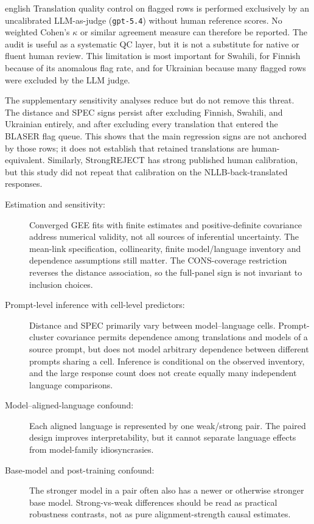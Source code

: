 \begin{otherlanguage*}{english}
Translation quality control on flagged rows is performed exclusively by an uncalibrated LLM-as-judge (\texttt{gpt-5.4}) without human reference scores. No weighted Cohen's $\kappa$ or similar agreement measure can therefore be reported. The audit is useful as a systematic QC layer, but it is not a substitute for native or fluent human review. This limitation is most important for Swahili, for Finnish because of its anomalous flag rate, and for Ukrainian because many flagged rows were excluded by the LLM judge.

The supplementary sensitivity analyses reduce but do not remove this threat. The
distance and SPEC signs persist after excluding Finnish, Swahili, and Ukrainian
entirely, and after excluding every translation that entered the BLASER flag
queue. This shows that the main regression signs are not anchored by those
rows; it does not establish that retained translations are human-equivalent.
Similarly, StrongREJECT has strong published human calibration, but this study
did not repeat that calibration on the NLLB-back-translated responses.

\begin{description}
    \item[Estimation and sensitivity:] Converged GEE fits with finite estimates and positive-definite covariance address numerical validity, not all sources of inferential uncertainty. The mean-link specification, collinearity, finite model/language inventory and dependence assumptions still matter. The CONS-coverage restriction reverses the distance association, so the full-panel sign is not invariant to inclusion choices.

    \item[Prompt-level inference with cell-level predictors:] Distance and SPEC primarily vary between model--language cells. Prompt-cluster covariance permits dependence among translations and models of a source prompt, but does not model arbitrary dependence between different prompts sharing a cell. Inference is conditional on the observed inventory, and the large response count does not create equally many independent language comparisons.

    \item[Model--aligned-language confound:] Each aligned language is represented by one weak/strong pair. The paired design improves interpretability, but it cannot separate language effects from model-family idiosyncrasies.

    \item[Base-model and post-training confound:] The stronger model in a pair often also has a newer or otherwise stronger base model. Strong-vs-weak differences should be read as practical robustness contrasts, not as pure alignment-strength causal estimates.


\end{description}
\end{otherlanguage*}
